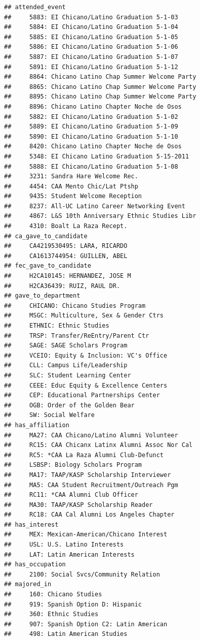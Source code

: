 \documentclass[]{book}
\begin{document}
\begin{verbatim}
## attended_event 
##     5883: EI Chicano/Latino Graduation 5-1-03
##     5884: EI Chicano/Latino Graduation 5-1-04
##     5885: EI Chicano/Latino Graduation 5-1-05
##     5886: EI Chicano/Latino Graduation 5-1-06
##     5887: EI Chicano/Latino Graduation 5-1-07
##     5891: EI Chicano/Latino Graduation 5-1-12
##     8864: Chicano Latino Chap Summer Welcome Party
##     8865: Chicano Latino Chap Summer Welcome Party
##     8895: Chicano Latino Chap Summer Welcome Party
##     8896: Chicano Latino Chapter Noche de Osos
##     5882: EI Chicano/Latino Graduation 5-1-02
##     5889: EI Chicano/Latino Graduation 5-1-09
##     5890: EI Chicano/Latino Graduation 5-1-10
##     8420: Chicano Latino Chapter Noche de Osos
##     5348: EI Chicano Latino Graduation 5-15-2011
##     5888: EI Chicano/Latino Graduation 5-1-08
##     3231: Sandra Hare Welcome Rec.
##     4454: CAA Mento Chic/Lat Ptshp
##     9435: Student Welcome Reception
##     8237: All-UC Latino Career Networking Event
##     4867: L&S 10th Anniversary Ethnic Studies Libr
##     4310: Boalt La Raza Recept.
## ca_gave_to_candidate 
##     CA4219530495: LARA, RICARDO
##     CA1613744954: GUILLEN, ABEL
## fec_gave_to_candidate 
##     H2CA10145: HERNANDEZ, JOSE M
##     H2CA36439: RUIZ, RAUL DR.
## gave_to_department 
##     CHICANO: Chicano Studies Program
##     MSGC: Multiculture, Sex & Gender Ctrs
##     ETHNIC: Ethnic Studies
##     TRSP: Transfer/ReEntry/Parent Ctr
##     SAGE: SAGE Scholars Program
##     VCEIO: Equity & Inclusion: VC's Office
##     CLL: Campus Life/Leadership
##     SLC: Student Learning Center
##     CEEE: Educ Equity & Excellence Centers
##     CEP: Educational Partnerships Center
##     OGB: Order of the Golden Bear
##     SW: Social Welfare
## has_affiliation 
##     MA27: CAA Chicano/Latino Alumni Volunteer
##     RC15: CAA Chicanx Latinx Alumni Assoc Nor Cal
##     RC5: *CAA La Raza Alumni Club-Defunct
##     LSBSP: Biology Scholars Program
##     MA17: TAAP/KASP Scholarship Interviewer
##     MA5: CAA Student Recruitment/Outreach Pgm
##     RC11: *CAA Alumni Club Officer
##     MA30: TAAP/KASP Scholarship Reader
##     RC18: CAA Cal Alumni Los Angeles Chapter
## has_interest 
##     MEX: Mexican-American/Chicano Interest
##     USL: U.S. Latino Interests
##     LAT: Latin American Interests
## has_occupation 
##     2100: Social Svcs/Community Relation
## majored_in 
##     160: Chicano Studies
##     919: Spanish Option D: Hispanic
##     360: Ethnic Studies
##     907: Spanish Option C2: Latin American
##     498: Latin American Studies

\end{verbatim}
\end{document}
